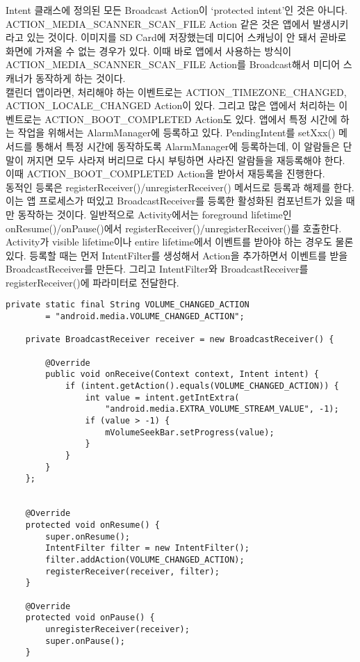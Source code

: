 Intent 클래스에 정의된 모든 Broadcast Action이 `protected intent'인 것은 아니다.
ACTION\_ME\-DIA\_SC\-A\-NNER\_SC\-AN\_FI\-LE Action 같은 것은 앱에서 발생시키라고 있는 것이다.
이미지를 SD Card에 저장했는데 미디어 스캐닝이 안 돼서 곧바로 화면에 가져올 수 없는 경우가 있다.
이때 바로 앱에서 사용하는 방식이 ACTION\_MEDIA\_SCANNER\_SCAN\_FILE Action를 Broadcast해서 미디어 스캐너가 동작하게 하는 것이다.\\

캘린더 앱이라면, 처리해야 하는 이벤트로는 ACTION\_TIMEZONE\_CHANGED,
ACTION\_LO\-CALE\_C\-HANG\-ED Action이 있다.
그리고 많은 앱에서 처리하는 이벤트로는 ACTION\_BOOT\_\-COMPLETED Action도 있다. 
앱에서 특정 시간에 하는 작업을 위해서는 AlarmManager에 등록하고 있다.
PendingIntent를 setXxx() 메서드를 통해서 특정 시간에 동작하도록 AlarmManager에 등록하는데, 이 알람들은 단말이 꺼지면 모두 사라져 버리므로 다시 부팅하면 사라진 알람들을 재등록해야 한다. 이때 ACTION\_BOOT\_COMPLETED Action을 받아서 재등록을 진행한다.\\

동적인 등록은 registerReceiver()/unregisterReceiver() 메서드로 등록과 해제를 한다. 이는 앱 프로세스가 떠있고 BroadcastReceiver를 등록한 활성화된 컴포넌트가 있을 때만 동작하는 것이다.
일반적으로 Activity에서는 foreground lifetime인 onResume()/onPause()에서 registerReceiver()/unregisterReceiver()를 호출한다.
Activity가 visible lifetime이나 entire lifetime에서 이벤트를 받아야 하는 경우도 물론 있다.
등록할 때는 먼저 IntentFilter를 생성해서 Action을 추가하면서 이벤트를 받을 BroadcastReceiver를 만든다. 
그리고 IntentFilter와 BroadcastReceiver를 registerReceiver()에 파라미터로 전달한다.
\begin{lstlisting}[frame=single] 
	private static final String VOLUME_CHANGED_ACTION 
		= "android.media.VOLUME_CHANGED_ACTION";

	private BroadcastReceiver receiver = new BroadcastReceiver() {
		
		@Override
		public void onReceive(Context context, Intent intent) {
			if (intent.getAction().equals(VOLUME_CHANGED_ACTION)) {
				int value = intent.getIntExtra(
					"android.media.EXTRA_VOLUME_STREAM_VALUE", -1);
				if (value > -1) {
					mVolumeSeekBar.setProgress(value);
				}
			}
		}
	};
	

	@Override
	protected void onResume() {
		super.onResume();
		IntentFilter filter = new IntentFilter();
		filter.addAction(VOLUME_CHANGED_ACTION);
		registerReceiver(receiver, filter);
	}
	
	@Override
	protected void onPause() {
		unregisterReceiver(receiver);
		super.onPause();
	}	
\end{lstlisting}

